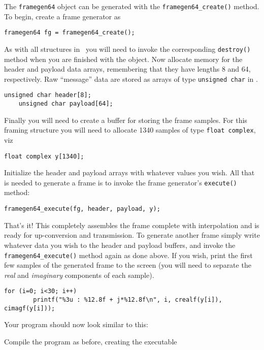 The {\tt framegen64} object can be generated with the
{\tt framegen64\_create()} method.
To begin, create a frame generator
as
%
\begin{Verbatim}[fontsize=\small]
    framegen64 fg = framegen64_create();
\end{Verbatim}
%
As with all structures in \liquid\ you will need to invoke the
corresponding {\tt destroy()} method when you are finished with the
object.
Now allocate memory for the header and payload data arrays,
remembering that they have lengths 8 and 64, respectively.
Raw ``message'' data are stored as arrays of type {\tt unsigned char} in
\liquid.
%
\begin{Verbatim}[fontsize=\small]
    unsigned char header[8];
    unsigned char payload[64];
\end{Verbatim}
%
Finally you will need to create a buffer for storing the frame samples.
For this framing structure you will need to allocate 1340 samples of
type {\tt float complex}, viz
%
\begin{Verbatim}[fontsize=\small]
    float complex y[1340];
\end{Verbatim}
%
Initialize the header and payload arrays with whatever values you wish.
All that is needed to generate a frame is to invoke the frame
generator's {\tt execute()} method:
%
\begin{Verbatim}[fontsize=\small]
    framegen64_execute(fg, header, payload, y);
\end{Verbatim}
%
That's it!
This completely assembles the frame complete with interpolation and is
ready for up-conversion and transmission.
To generate another frame simply write whatever data you wish to the
header and payload buffers, and invoke the {\tt framegen64\_execute()}
method again as done above.
If you wish, print the first few samples of the generated frame to the
screen (you will need to separate the {\em real} and {\em imaginary}
components of each sample).
%
\begin{Verbatim}[fontsize=\small]
    for (i=0; i<30; i++)
        printf("%3u : %12.8f + j*%12.8f\n", i, crealf(y[i]), cimagf(y[i]));
\end{Verbatim}
%
Your program should now look similar to this:
%

%
Compile the program as before, creating the executable

